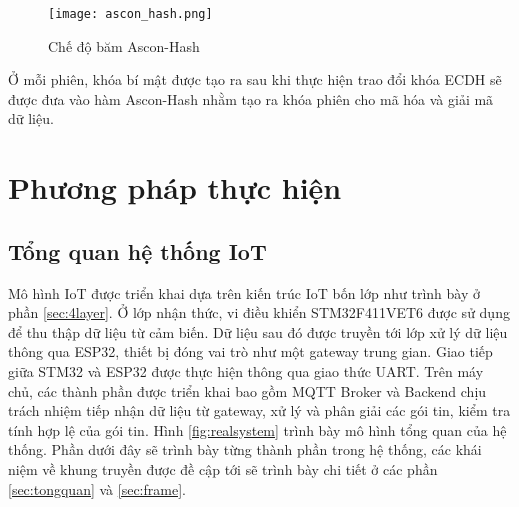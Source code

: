 \begin{figure}[h]
    \centering
    \texttt{[image: ascon\_hash.png]}
    \caption{Chế độ băm Ascon-Hash}
    \label{fig:asconhash}
\end{figure}

Ở mỗi phiên, khóa bí mật được tạo ra sau khi thực hiện trao đổi khóa ECDH sẽ được đưa vào hàm Ascon-Hash nhằm tạo ra khóa phiên cho mã hóa và giải mã dữ liệu.

\section{Phương pháp thực hiện}
\label{sec:phuongphap}
\subsection{Tổng quan hệ thống IoT}
Mô hình IoT được triển khai dựa trên kiến trúc IoT bốn lớp như trình bày ở phần \ref{sec:4layer}. Ở lớp nhận thức, vi điều khiển STM32F411VET6 được sử dụng để thu thập dữ liệu từ cảm biến. Dữ liệu sau đó được truyền tới lớp xử lý dữ liệu thông qua ESP32, thiết bị đóng vai trò như một gateway trung gian. Giao tiếp giữa STM32 và ESP32 được thực hiện thông qua giao thức UART. Trên máy chủ, các thành phần được triển khai bao gồm MQTT Broker và Backend chịu trách nhiệm tiếp nhận dữ liệu từ gateway, xử lý và phân giải các gói tin, kiểm tra tính hợp lệ của gói tin. Hình \ref{fig:realsystem} trình bày mô hình tổng quan của hệ thống. Phần dưới đây sẽ trình bày từng thành phần trong hệ thống, các khái niệm về khung truyền được đề cập tới sẽ trình bày chi tiết ở các phần \ref{sec:tongquan} và \ref{sec:frame}.


